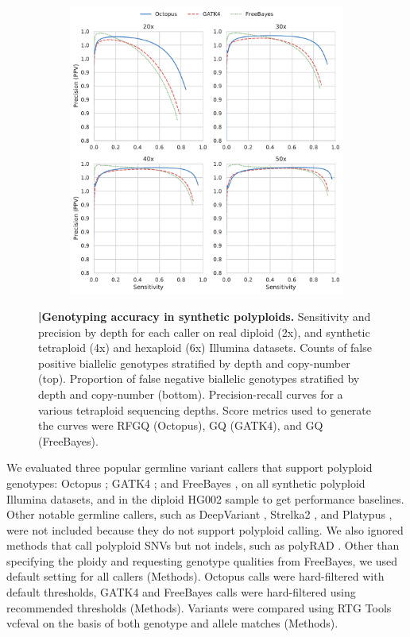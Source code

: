 \documentclass[notitlepage, twocolumn, 10pt]{article}
\begin{document}
\begin{figure}[ht!]
\begin{subfigure}[b]{0.4\textwidth}
        \includegraphics[height=\textwidth,width=\textwidth]{figures/synthetic-tetraploid-pr-curves_20-50x}
        \label{fig:synthetic:precision-recall}
    \end{subfigure}
    \vspace{-1cm}
    \caption{\textbf{|\:Genotyping accuracy in synthetic polyploids.} \protect{} Sensitivity and precision by depth for each caller on real diploid (2x), and synthetic tetraploid (4x) and hexaploid (6x) Illumina datasets. \protect{} Counts of false positive biallelic genotypes stratified by depth and copy-number (top). Proportion of false negative biallelic genotypes stratified by depth and copy-number (bottom). \protect{} Precision-recall curves for a various tetraploid sequencing depths. Score metrics used to generate the curves were RFGQ (Octopus), GQ (GATK4), and GQ (FreeBayes).}
    \label{fig:synthetic}
\end{figure}

We evaluated three popular germline variant callers that support polyploid genotypes: Octopus \cite{RN844}; GATK4 \cite{RN598}; and FreeBayes \cite{RN538}, on all synthetic polyploid Illumina datasets, and in the diploid HG002 sample to get performance baselines. Other notable germline callers, such as DeepVariant \cite{RN619}, Strelka2 \cite{RN604}, and Platypus \cite{RN5}, were not included because they do not support polyploid calling. We also ignored methods that  call polyploid SNVs but not indels, such as polyRAD \cite{RN662}. Other than specifying the ploidy and requesting genotype qualities from FreeBayes, we used default setting for all callers (Methods). Octopus calls were hard-filtered with default thresholds, GATK4 and FreeBayes calls were hard-filtered using recommended thresholds (Methods). Variants were compared using RTG Tools vcfeval \cite{RN169} on the basis of both genotype and allele matches (Methods).
\end{document}
